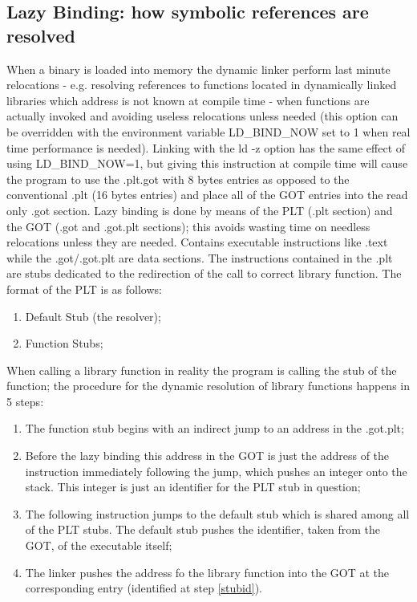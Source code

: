 \subsection{Lazy Binding: how symbolic references are resolved}
When a binary is loaded into memory the dynamic linker perform last minute relocations - e.g. resolving references to
functions located in dynamically linked libraries which address is not known at compile time - when functions are
actually invoked and avoiding useless relocations unless needed (this option can be overridden with the environment
variable {\ttfamily LD\_BIND\_NOW} set to 1 when real time performance is needed).
Linking with the {\ttfamily ld -z} option has the same effect of using {\ttfamily LD\_BIND\_NOW=1}, but giving this
instruction at compile time will cause the program to use the {\ttfamily .plt.got} with 8 bytes entries as opposed to
the conventional {\ttfamily .plt} (16 bytes entries) and place all of the GOT entries into the read only {\ttfamily
.got} section.
Lazy binding is done by means of the PLT ({\ttfamily .plt} section) and the GOT ({\ttfamily .got} and {\ttfamily
.got.plt} sections); this avoids wasting time on needless relocations unless they are needed. Contains executable
instructions like {\ttfamily .text} while the {\ttfamily .got}/{\ttfamily .got.plt} are data sections. The instructions
contained in the {\ttfamily .plt} are stubs dedicated to the redirection of the call to correct library function. The
format of the PLT is as follows:
\begin{enumerate}
    \item Default Stub (the resolver);
    \item Function Stubs;
\end{enumerate}
When calling a library function in reality the program is calling the stub of the function; the procedure for the
dynamic resolution of library functions happens in 5 steps:
\begin{enumerate}
    \item The function stub begins with an indirect jump to an address in the {\ttfamily .got.plt};
    \item \label{stubid} Before the lazy binding this address in the GOT is just the address of the instruction
        immediately  following the jump, which pushes an integer onto the stack. This integer is just an identifier for
        the PLT stub in question;
    \item The following instruction jumps to the default stub which is shared among all of the PLT stubs. The default
        stub pushes the identifier, taken from the GOT, of the executable itself;
    \item The linker pushes the address fo the library function into the GOT at the corresponding entry (identified at
        step \ref{stubid}).
\end{enumerate}
